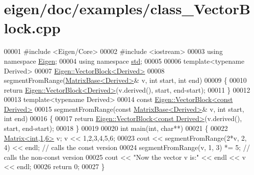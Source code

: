 \hypertarget{eigen_2doc_2examples_2class___vector_block_8cpp_source}{}\section{eigen/doc/examples/class\+\_\+\+Vector\+Block.cpp}
\label{eigen_2doc_2examples_2class___vector_block_8cpp_source}

\begin{DoxyCode}
00001 \textcolor{preprocessor}{#include <Eigen/Core>}
00002 \textcolor{preprocessor}{#include <iostream>}
00003 \textcolor{keyword}{using namespace }\hyperlink{namespace_eigen}{Eigen};
00004 \textcolor{keyword}{using namespace }\hyperlink{namespacestd}{std};
00005 
00006 \textcolor{keyword}{template}<\textcolor{keyword}{typename} Derived>
00007 \hyperlink{group___core___module_class_eigen_1_1_vector_block}{Eigen::VectorBlock<Derived>}
00008 segmentFromRange(\hyperlink{group___core___module_class_eigen_1_1_matrix_base}{MatrixBase<Derived>}& v, \textcolor{keywordtype}{int} start, \textcolor{keywordtype}{int} end)
00009 \{
00010   \textcolor{keywordflow}{return} \hyperlink{group___core___module_class_eigen_1_1_vector_block}{Eigen::VectorBlock<Derived>}(v.derived(), start, end-start);
00011 \}
00012 
00013 \textcolor{keyword}{template}<\textcolor{keyword}{typename} Derived>
00014 \textcolor{keyword}{const} \hyperlink{group___core___module_class_eigen_1_1_vector_block}{Eigen::VectorBlock<const Derived>}
00015 segmentFromRange(\textcolor{keyword}{const} \hyperlink{group___core___module_class_eigen_1_1_matrix_base}{MatrixBase<Derived>}& v, \textcolor{keywordtype}{int} start, \textcolor{keywordtype}{int} end)
00016 \{
00017   \textcolor{keywordflow}{return} \hyperlink{group___core___module_class_eigen_1_1_vector_block}{Eigen::VectorBlock<const Derived>}(v.derived(), start, end-start);
00018 \}
00019 
00020 \textcolor{keywordtype}{int} main(\textcolor{keywordtype}{int}, \textcolor{keywordtype}{char}**)
00021 \{
00022   \hyperlink{group___core___module_class_eigen_1_1_matrix}{Matrix<int,1,6>} v; v << 1,2,3,4,5,6;
00023   cout << segmentFromRange(2*v, 2, 4) << endl; \textcolor{comment}{// calls the const version}
00024   segmentFromRange(v, 1, 3) *= 5;              \textcolor{comment}{// calls the non-const version}
00025   cout << \textcolor{stringliteral}{"Now the vector v is:"} << endl << v << endl;
00026   \textcolor{keywordflow}{return} 0;
00027 \}
\end{DoxyCode}
